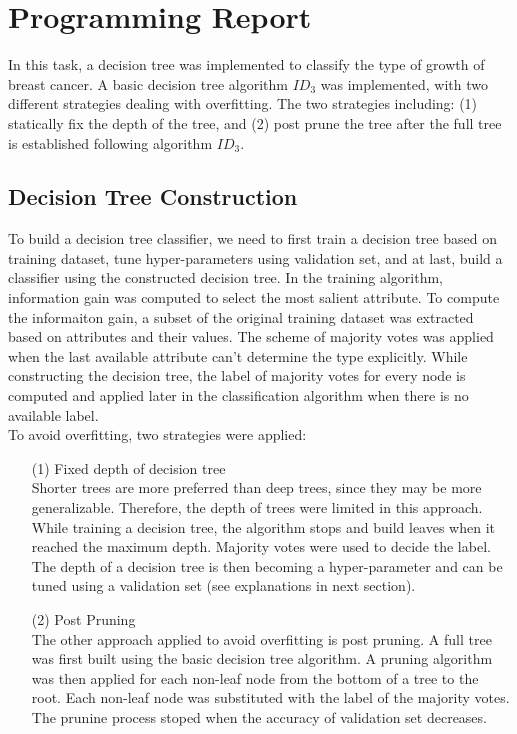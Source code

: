\documentclass[11pt]{article}
\begin{document}
\section{Programming Report}
In this task, a decision tree was implemented to classify the type of growth of breast cancer. A basic decision tree algorithm \(ID_3\) was implemented, with two different strategies dealing with overfitting. The two strategies including: (1) statically fix the depth of the tree, and (2) post prune the tree after the full tree is established following algorithm \(ID_3\).

\subsection{Decision Tree Construction}
To build a decision tree classifier, we need to first train a decision tree based on training dataset, tune hyper-parameters using validation set, and at last, build a classifier using the constructed decision tree. In the training algorithm, information gain was computed to select the most salient attribute. To compute the informaiton gain, a subset of the original training dataset was extracted based on attributes and their values. The scheme of majority votes was applied when the last available attribute can't determine the type explicitly. While constructing the decision tree, the label of majority votes for every node is computed and applied later in the classification algorithm when there is no available label.\\
To avoid overfitting, two strategies were applied:
\begin{itemize}
\item[(1)] Fixed depth of decision tree\\
Shorter trees are more preferred than deep trees, since they may be more generalizable. Therefore, the depth of trees were limited in this approach. While training a decision tree, the  algorithm stops and build leaves when it reached the maximum depth. Majority votes were used to decide the label. The depth of a decision tree is then becoming a hyper-parameter and can be tuned using a validation set (see explanations in next section).
\item[(2)] Post Pruning\\
The other approach applied to avoid overfitting is post pruning. A full tree was first built using the basic decision tree algorithm. A pruning algorithm was then applied for each non-leaf node from the bottom of a tree to the root. Each non-leaf node was substituted with the label of the majority votes. The prunine process stoped when the accuracy of validation set decreases.
\end{itemize}
\end{document}
